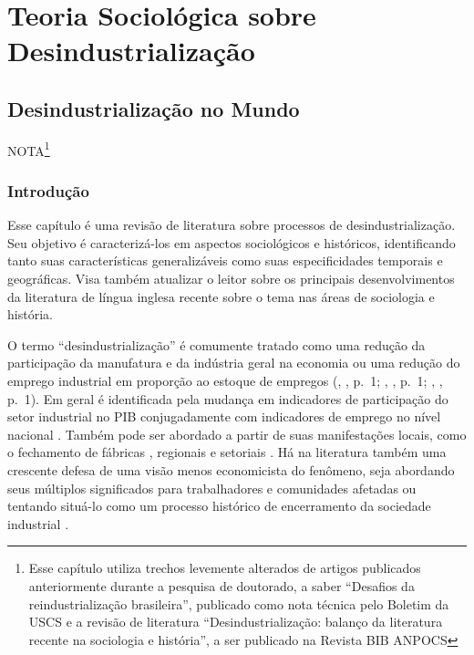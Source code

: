 \section{Teoria Sociológica sobre Desindustrialização}\label{teoria-socioluxf3gica-sobre-desindustrializauxe7uxe3o}

\subsection{Desindustrialização no Mundo}\label{desindustrializauxe7uxe3o-no-mundo}
NOTA\footnote{Esse capítulo utiliza trechos levemente alterados de artigos publicados 
anteriormente durante a pesquisa de doutorado, a saber ``Desafios da reindustrialização brasileira'',
publicado como nota técnica pelo Boletim da USCS e a revisão de literatura ``Desindustrialização: 
balanço da literatura recente na sociologia e história'', a ser publicado na Revista BIB ANPOCS}
\subsubsection{Introdução}

Esse capítulo é uma revisão de literatura sobre processos de
desindustrialização. Seu objetivo é caracterizá-los em aspectos
sociológicos e históricos, identificando tanto suas características
generalizáveis como suas especificidades temporais e geográficas. Visa
também atualizar o leitor sobre os principais desenvolvimentos da
literatura de língua inglesa recente sobre o tema nas áreas de
sociologia e história.

O termo ``desindustrialização'' é comumente tratado como uma redução da
participação da manufatura e da indústria geral na economia
\citep[p.~1]{pula_industrialization_2017} ou
uma redução do emprego industrial em proporção ao estoque de empregos
(\citeauthor{dandaneau_deindustrialization_2012}, \citeyear{dandaneau_deindustrialization_2012}, p.~1; \citeauthor{kollmeyer_deindustrialization_2020}, \citeyear{kollmeyer_deindustrialization_2020}, p.~1; \citeauthor{orum_deindustrialization_2019}, \citeyear{orum_deindustrialization_2019}, p.~1). Em geral é
identificada pela mudança em indicadores de participação do setor
industrial no PIB
\citep{rowthorn_growth_1999} conjugadamente com indicadores de emprego no nível nacional
\citep{tregenna_characterising_2009}.
Também pode ser abordado a partir de suas manifestações locais, como o
fechamento de fábricas
\citep{clarke_closing_2015,hodson_titanic_2019}, regionais e setoriais
\citep{berger_burdens_2017,durazzi_social_2020}. Há na literatura também uma
crescente defesa de uma visão menos economicista do fenômeno, seja
abordando seus múltiplos significados para trabalhadores e comunidades
afetadas \citep{cowie_beyond_2003} ou tentando situá-lo como um processo histórico de
encerramento da sociedade industrial
\citep{strangleman_deindustrialisation_2017}.

